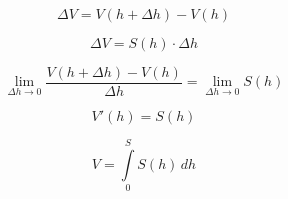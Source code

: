 \documentclass[12pt,a4paper]{article}
\begin{document}
$$ \Delta V = V(h + \Delta h) - V(h) $$

$$ \Delta V = S(h)\cdot \Delta h $$

$$ \lim_{\Delta h \to 0} \frac{V(h + \Delta h) - V(h)}{\Delta h} = \lim_{\Delta h \to 0} S(h) $$

$$ V'(h) = S(h) $$

$$ \boxed{V = \int\limits_0^S S(h)\, dh} $$

\end{document}
